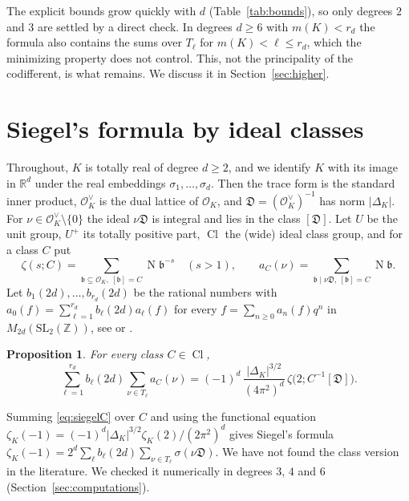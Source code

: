 \documentclass[11pt]{amsart}
\newtheorem{proposition}[theorem]{Proposition}
\theoremstyle{definition}
\numberwithin{equation}{section}
\DeclareMathOperator{\N}{N}
\DeclareMathOperator{\Cl}{Cl}
\newcommand{\OK}{\mathcal{O}_K}
\newcommand{\OKd}{\mathcal{O}_K^{\vee}}
\newcommand{\Dif}{\mathfrak{D}}
\newcommand{\Z}{\mathbb{Z}}
\newcommand{\R}{\mathbb{R}}
\begin{document}
The explicit bounds grow quickly with $d$ (Table~\ref{tab:bounds}), so only degrees $2$ and $3$ are
settled by a direct check.  In degrees $d\ge6$ with $m(K)<r_d$ the formula also contains the sums
over $T_\ell$ for $m(K)<\ell\le r_d$, which the minimizing property does not control.  This, not the
principality of the codifferent, is what remains.  We discuss it in Section~\ref{sec:higher}.

\section{Siegel's formula by ideal classes}\label{sec:siegel}

Throughout, $K$ is totally real of degree $d\ge2$, and we identify $K$ with its image in $\R^d$
under the real embeddings $\sigma_1,\dots,\sigma_d$.  Then the trace form is the standard inner
product, $\OKd$ is the dual lattice of $\OK$, and $\Dif=(\OKd)^{-1}$ has norm $|\Delta_K|$.  For
$\nu\in\OKd\setminus\{0\}$ the ideal $\nu\Dif$ is integral and lies in the class $[\Dif]$.  Let $U$ be
the unit group, $U^+$ its totally positive part, $\Cl$ the (wide) ideal class group, and for a class
$C$ put
\[
  \zeta(s;C)=\sum_{\mathfrak b\subseteq\OK,\ [\mathfrak b]=C}\N\mathfrak b^{-s}\quad(s>1),\qquad
  a_C(\nu)=\sum_{\mathfrak b\mid\nu\Dif,\ [\mathfrak b]=C}\N\mathfrak b .
\]
Let $b_1(2d),\dots,b_{r_d}(2d)$ be the rational numbers with $a_0(f)=\sum_{\ell=1}^{r_d}b_\ell(2d)a_\ell(f)$
for every $f=\sum_{n\ge0}a_n(f)q^n$ in $M_{2d}(\mathrm{SL}_2(\Z))$, see \cite{Si} or
\cite[Theorem~2.2]{KM}.

\begin{proposition}\label{prop:siegel}
For every class $C\in\Cl$,
\begin{equation}\label{eq:siegelC}
  \sum_{\ell=1}^{r_d}b_\ell(2d)\sum_{\nu\in T_\ell}a_C(\nu)
  =(-1)^d\,\frac{|\Delta_K|^{3/2}}{(4\pi^2)^d}\,\zeta\bigl(2;C^{-1}[\Dif]\bigr).
\end{equation}
\end{proposition}

Summing \eqref{eq:siegelC} over $C$ and using the functional equation
$\zeta_K(-1)=(-1)^d|\Delta_K|^{3/2}\zeta_K(2)/(2\pi^2)^d$ gives Siegel's formula
$\zeta_K(-1)=2^d\sum_\ell b_\ell(2d)\sum_{\nu\in T_\ell}\sigma(\nu\Dif)$.  We have not found the class
version in the literature.  We checked it numerically in degrees $3$, $4$ and $6$
(Section~\ref{sec:computations}).
\end{document}
